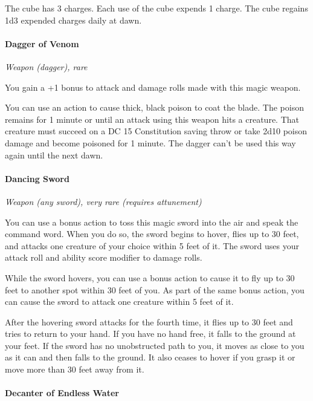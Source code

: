 \documentclass[
]{article}
\begin{document}
The cube has 3 charges. Each use of the cube expends 1 charge. The cube
regains 1d3 expended charges daily at dawn.

\hypertarget{dagger-of-venom}{%
\paragraph{Dagger of Venom}\label{dagger-of-venom}}

\emph{Weapon (dagger), rare}

You gain a +1 bonus to attack and damage rolls made with this magic
weapon.

You can use an action to cause thick, black poison to coat the blade.
The poison remains for 1 minute or until an attack using this weapon
hits a creature. That creature must succeed on a DC 15 Constitution
saving throw or take 2d10 poison damage and become poisoned for 1
minute. The dagger can't be used this way again until the next dawn.

\hypertarget{dancing-sword}{%
\paragraph{Dancing Sword}\label{dancing-sword}}

\emph{Weapon (any sword), very rare (requires attunement)}

You can use a bonus action to toss this magic sword into the air and
speak the command word. When you do so, the sword begins to hover, flies
up to 30 feet, and attacks one creature of your choice within 5 feet of
it. The sword uses your attack roll and ability score modifier to damage
rolls.

While the sword hovers, you can use a bonus action to cause it to fly up
to 30 feet to another spot within 30 feet of you. As part of the same
bonus action, you can cause the sword to attack one creature within 5
feet of it.

After the hovering sword attacks for the fourth time, it flies up to 30
feet and tries to return to your hand. If you have no hand free, it
falls to the ground at your feet. If the sword has no unobstructed path
to you, it moves as close to you as it can and then falls to the ground.
It also ceases to hover if you grasp it or move more than 30 feet away
from it.

\hypertarget{decanter-of-endless-water}{%
\paragraph{Decanter of Endless Water}\label{decanter-of-endless-water}}
\end{document}
